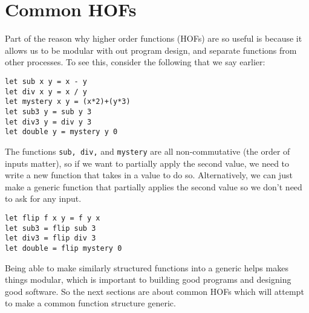 \documentclass[main.tex]{subfiles}
\begin{document}
\section{Common HOFs}
Part of the reason why higher order functions (HOFs) are so useful is because it allows us to be modular with out program design, and separate functions from other processes. To see this, consider the following that we say earlier:
\begin{lstlisting}[style=Myocamlstyle]
let sub x y = x - y
let div x y = x / y
let mystery x y = (x*2)+(y*3)
let sub3 y = sub y 3
let div3 y = div y 3
let double y = mystery y 0
\end{lstlisting}
The functions \texttt{sub, div,} and \texttt{mystery} are all non-commutative (the order of inputs matter), so if we want to partially apply the second value, we need to write a new function that takes in a value to do so. Alternatively, we can just make a generic function that partially applies the second value so we don't need to ask for any input.
\begin{lstlisting}
let flip f x y = f y x
let sub3 = flip sub 3
let div3 = flip div 3
let double = flip mystery 0
\end{lstlisting}
Being able to make similarly structured functions into a generic helps makes things modular, which is important to building good programs and designing good software. 
So the next sections are about common HOFs which will attempt to make a common function structure generic. 
\end{document}

